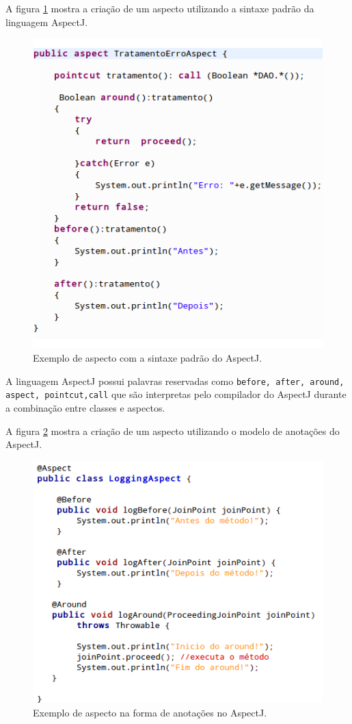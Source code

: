 \documentclass[tc,oneside]{iiufrgs}
\begin{document}
A figura \ref{fig:aspectjpadrao} mostra a criação de um aspecto utilizando a sintaxe padrão da linguagem AspectJ.

\begin{figure}[ht]
	\centering
	\includegraphics[scale=0.5]{figuras/aspecJ-aspecto.png}
	\caption{Exemplo de aspecto com a sintaxe padrão do AspectJ.}
	\label{fig:aspectjpadrao}
\end{figure}

A linguagem AspectJ possui palavras reservadas como \texttt{before, after, around, aspect, pointcut,call} que são interpretas pelo compilador do AspectJ durante a combinação entre classes e aspectos.

A figura \ref{fig:aspectj} mostra a criação de um aspecto utilizando o modelo de anotações  do AspectJ.

\begin{figure}[ht]
	\centering
	\includegraphics[scale=0.5]{figuras/ferramentas/aspectj.png}
	\caption{Exemplo de aspecto na forma de anotações no AspectJ.}
	\label{fig:aspectj}
\end{figure}
\end{document}
